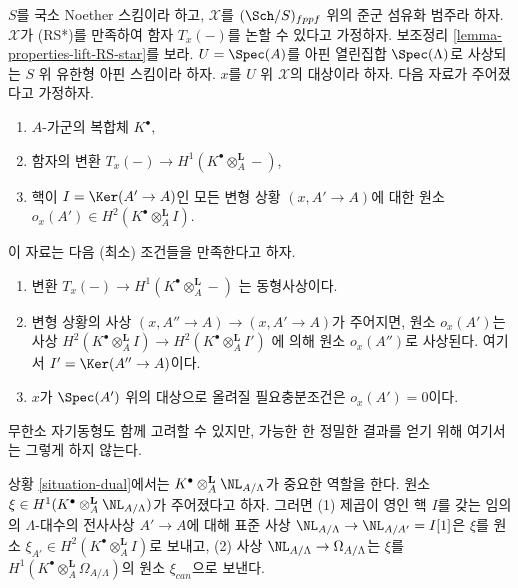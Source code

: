 \begin{situation}
\label{situation-dual}
$S$를 국소 Noether 스킴이라 하고, $\mathcal{X}$를
$(\Sch/S)_{fppf}$ 위의 준군 섬유화 범주라 하자.
$\mathcal{X}$가 (RS*)를 만족하여 함자 $T_x(-)$를 논할 수 있다고 가정하자.
보조정리 \ref{lemma-properties-lift-RS-star}를 보라.
$U = \Spec(A)$를 아핀 열린집합 $\Spec(\Lambda)$로 사상되는
$S$ 위 유한형 아핀 스킴이라 하자.
$x$를 $U$ 위 $\mathcal{X}$의 대상이라 하자. 다음 자료가 주어졌다고 가정하자.
\begin{enumerate}
\item $A$-가군의 복합체 $K^\bullet$,
\item 함자의 변환
$T_x(-) \to H^1(K^\bullet \otimes_A^\mathbf{L} -)$,
\item 핵이 $I = \Ker(A' \to A)$인 모든 변형 상황 $(x, A' \to A)$에 대한
원소 $o_x(A') \in H^2(K^\bullet \otimes_A^\mathbf{L} I)$.
\end{enumerate}
이 자료는 다음 (최소) 조건들을 만족한다고 하자.
\begin{enumerate}
\item[(i)] 변환
$T_x(-) \to H^1(K^\bullet \otimes_A^\mathbf{L} -)$
는 동형사상이다.
\item[(ii)] 변형 상황의 사상 $(x, A'' \to A) \to (x, A' \to A)$가 주어지면,
원소 $o_x(A')$는 사상
$H^2(K^\bullet \otimes_A^\mathbf{L} I) \to
H^2(K^\bullet \otimes_A^\mathbf{L} I')$
에 의해 원소 $o_x(A'')$로 사상된다. 여기서 $I' = \Ker(A'' \to A)$이다.
\item[(iii)] $x$가 $\Spec(A')$ 위의 대상으로 올려질 필요충분조건은
$o_x(A') = 0$이다.
\end{enumerate}
무한소 자기동형도 함께 고려할 수 있지만, 가능한 한 정밀한 결과를 얻기
위해 여기서는 그렇게 하지 않는다.
\end{situation}

\noindent
상황 \ref{situation-dual}에서는
$K^\bullet \otimes_A^\mathbf{L} \NL_{A/\Lambda}$가 중요한 역할을 한다.
원소 $\xi \in H^1(K^\bullet \otimes_A^\mathbf{L} \NL_{A/\Lambda})$가
주어졌다고 하자. 그러면 (1) 제곱이 영인 핵 $I$를 갖는 임의의
$\Lambda$-대수의 전사사상 $A' \to A$에 대해 표준 사상
$\NL_{A/\Lambda} \to \NL_{A/A'} = I[1]$은
$\xi$를 원소 $\xi_{A'} \in H^2(K^\bullet \otimes_A^\mathbf{L} I)$로 보내고,
(2) 사상 $\NL_{A/\Lambda} \to \Omega_{A/\Lambda}$는
$\xi$를 $H^1(K^\bullet \otimes_A^\mathbf{L} \Omega_{A/\Lambda})$의
원소 $\xi_{can}$으로 보낸다.


